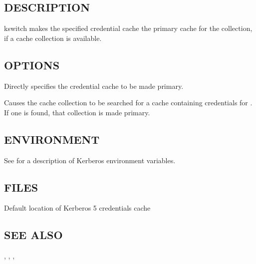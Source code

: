 \documentclass[letterpaper,10pt,english]{sphinxmanual}
\begin{document}
\subsection{DESCRIPTION}
\label{\detokenize{user/user_commands/kswitch:description}}
\sphinxAtStartPar
kswitch makes the specified credential cache the primary cache for the
collection, if a cache collection is available.


\subsection{OPTIONS}
\label{\detokenize{user/user_commands/kswitch:options}}\begin{description}
\sphinxAtStartPar
Directly specifies the credential cache to be made primary.

\sphinxAtStartPar
Causes the cache collection to be searched for a cache containing
credentials for .  If one is found, that collection is
made primary.

\end{description}


\subsection{ENVIRONMENT}
\label{\detokenize{user/user_commands/kswitch:environment}}
\sphinxAtStartPar
See {\hyperref[\detokenize{user/user_config/kerberos:kerberos-7}]{}} for a description of Kerberos environment
variables.


\subsection{FILES}
\label{\detokenize{user/user_commands/kswitch:files}}\begin{description}
\sphinxAtStartPar
Default location of Kerberos 5 credentials cache

\end{description}


\subsection{SEE ALSO}
\label{\detokenize{user/user_commands/kswitch:see-also}}
\sphinxAtStartPar
{\hyperref[\detokenize{user/user_commands/kinit:kinit-1}]{}}, {\hyperref[\detokenize{user/user_commands/kdestroy:kdestroy-1}]{}}, {\hyperref[\detokenize{user/user_commands/klist:klist-1}]{}},
{\hyperref[\detokenize{user/user_config/kerberos:kerberos-7}]{}}
\end{document}
